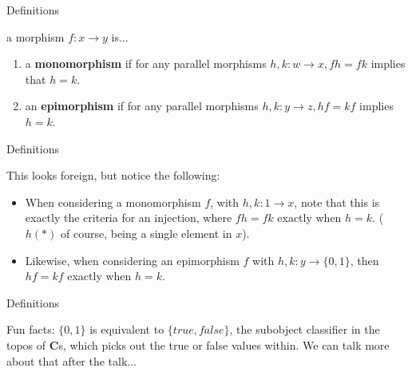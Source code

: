 \documentclass[tikz]{beamer}
\theoremstyle{definition}
\begin{document}
\begin{frame}{Definitions}
    \begin{definition}
        a morphism $f: x \to y$ is...
        \begin{enumerate}[i]
            \item a \textbf{monomorphism} if for any parallel morphisms $h,k: w \to x, fh = fk$ implies that $h = k$.
            
            \item an \textbf{epimorphism} if for any parallel morphisms $h,k: y \to z, hf = kf$ implies $h = k$.
        \end{enumerate}
    \end{definition}

\end{frame}{}
\begin{frame}{Definitions}

This looks foreign, but notice the following: 

\begin{itemize}
    \item When considering a monomorphism $f$, with $h, k: 1 \to x$, note that this is exactly the criteria for an injection, where $fh = fk$ exactly when $h = k$. ($h(*)$ of course, being a single element in $x$).
    
    \item Likewise, when considering an epimorphism $f$ with $h,k : y \to \{0,1\}$, then $hf = kf$ exactly when $h = k$.
\end{itemize}{}
    
\end{frame}{}

\begin{frame}{Definitions}
    
    Fun facts: $\{0,1\}$ is equivalent to $\{true, false\}$, the subobject classifier in the topos of $\mathbf{C}$s, which picks out the true or false values within. We can talk more about that after the talk...
\end{frame}
\end{document}
